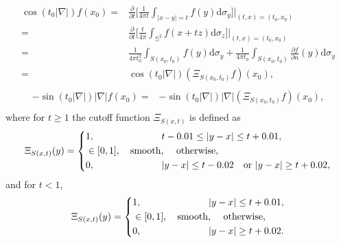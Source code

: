 \documentclass[11pt,twoside]{article}
\def\f{\frac}
\def\p{\partial}
\newcommand{\abs}[1]{\left|#1\right|}
\newcommand{\dS}{\mathrm{d}\sigma_y}
\newcommand{\Sph}{\mathbb{S}^2}
\theoremstyle{plain}
\theoremstyle{definition}
\numberwithin{equation}{section}
\begin{document}
	\begin{equation}\label{eq:Huygens2}
		\begin{split}
			\cos(t_0|\nabla|)f(x_0)
			=&\frac{\partial}{\partial t}\big[ \frac{1}{4\pi t} \int_{\abs{x-y}=t} f(y)\dS \big]\big|_{(t,x) = (t_0,x_0)}\\
			=&\frac{\partial}{\partial t}\big[ \frac{t}{4\pi} \int_{\Sph} f(x+tz) \mathrm{d} \sigma_z \big]\big|_{(t,x) = (t_0,x_0)}\\
			=&\frac{1}{4\pi t_0^2} \int_{S(x_0,t_0)} f(y)\dS+\frac{1}{4\pi t_0} \int_{S(x_0,t_0)} \f{\p f}{\p n}(y)\dS\\
			=&	\cos(t_0|\nabla|)(\Xi_{S(x_0,t_0)}f)(x_0), \\
		\end{split}
	\end{equation}
	\begin{equation}\label{eq:Huygens3}
		\begin{split}
			-\sin(t_0|\nabla|)|\nabla|f(x_0)
			=& -\sin(t_0|\nabla|)|\nabla|(\Xi_{S(x_0,t_0)}f)(x_0), \\
		\end{split}
	\end{equation}
	where for $t\ge 1 $ the cutoff function $\Xi_{S(x,t)}$ is defined as
	\begin{equation*}
		\Xi_{S(x,t)} (y) = 	\left\{
		\begin{aligned}
			&1,\quad\quad\quad\quad\quad\quad\quad t-0.01\le|y-x|\le t+0.01,\\
			&\in[0,1],\quad \text{smooth, \quad otherwise},\\
			&0,\quad\quad\quad\quad\quad\quad\quad |y-x|\le t-0.02\quad\text{or}\ |y-x|\ge t+0.02,
		\end{aligned}
		\right.
	\end{equation*}
	and for $t< 1$,
	\begin{equation*}
		\Xi_{S(x,t)} (y) = 	\left\{
		\begin{aligned}
			&1,\quad\quad\quad\quad\quad\quad\quad |y-x|\le t+0.01,\\
			&\in[0,1], \quad \text{smooth, \quad otherwise},\\
			&0,\quad\quad\quad\quad\quad\quad\quad |y-x|\ge t+0.02.
		\end{aligned}
		\right.
	\end{equation*}
\end{document}
